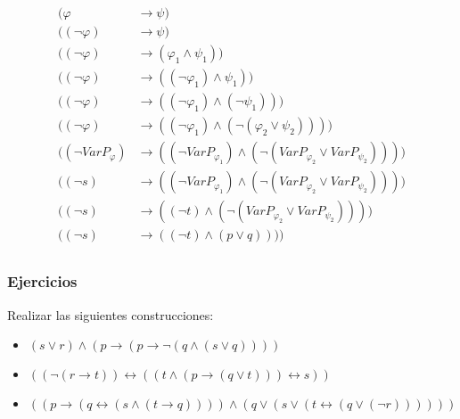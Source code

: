 \documentclass[a4paper]{article}
\begin{document}
\begin{align*}
    (\varphi & \rightarrow \psi) \\
    ((\neg \varphi) & \rightarrow \psi) \\
    ((\neg \varphi) &\rightarrow (\varphi_{1} \land \psi_{1})) \\
    ((\neg \varphi) &\rightarrow ((\neg \varphi_{1}) \land \psi_{1})) \\
    ((\neg \varphi) &\rightarrow ((\neg \varphi_{1}) \land (\neg \psi_{1}))) \\
    ((\neg \varphi) &\rightarrow ((\neg \varphi_{1}) \land (\neg (\varphi_{2} \lor \psi_{2})))) \\
    ((\neg VarP_{\varphi}) &\rightarrow ((\neg VarP_{\varphi_{1}}) \land (\neg (VarP_{\varphi_{2}} \lor VarP_{\psi_{2}})))) \\
    ((\neg s) &\rightarrow ((\neg VarP_{\varphi_{1}}) \land (\neg (VarP_{\varphi_{2}} \lor VarP_{\psi_{2}})))) \\
    ((\neg s) &\rightarrow ((\neg t) \land (\neg (VarP_{\varphi_{2}} \lor VarP_{\psi_{2}})))) \\
    ((\neg s) &\rightarrow ((\neg t) \land (p \lor q)))) \\
\end{align*}
\subsubsection{Ejercicios}
Realizar las siguientes construcciones:
\begin{itemize}
    \item \(\left(s \lor r\right) \land \left(p \rightarrow \left(p \rightarrow \neg \left(q \land \left(s \lor q\right)\right)\right)\right)\)
    \item \(\left(\left(\neg \left(r \rightarrow t\right)\right) \leftrightarrow \left(\left(t \land \left(p \rightarrow \left(q \lor t\right)\right)\right) \leftrightarrow s \right)\right)\)
    \item \(\left(\left(p \rightarrow \left(q \leftrightarrow \left(s \land \left(t \rightarrow q\right)\right)\right)\right)\land \left(q \lor \left(s \lor \left(t \leftrightarrow \left(q \lor \left(\neg r\right)\right)\right)\right)\right) \right)\)
\end{itemize}
\end{document}
